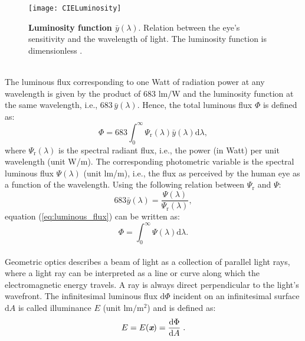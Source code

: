 \begin{figure}[t]
  \begin{center}
  \texttt{[image: CIELuminosity]}
  \end{center}
  \caption{\textbf{Luminosity function $\bar{y}(\lambda)$}. Relation between the eye's sensitivity and the wavelength of light. The luminosity function is dimensionless  \cite{wiki}.}
  \label{fig:luminosityfunction}
  \end{figure}
\\ \indent The luminous flux corresponding to one Watt of radiation power at any wavelength is given by the product of $683$ $\textrm{lm/W}$ and the luminosity function at the same wavelength,
i.e., $683 \, \bar{y}(\lambda)$. Hence, the total luminous flux $\Phi$ is defined as:
\begin{equation}\label{eq:luminous_flux}
\Phi = 683 \int_0^\infty \Psi_\textrm{r}(\lambda) \bar{y}(\lambda)\textrm{d}\lambda,
\end{equation}
where $\Psi_\textrm{r}(\lambda)$ is the spectral radiant flux, i.e., the power (in Watt) per unit wavelength (unit \textrm{W}/\textrm{m}). The corresponding photometric variable is the spectral luminous flux $\Psi(\lambda)$ (unit \textrm{lm}/\textrm{m}), i.e., the flux as perceived by the human eye as a function of the wavelength. 
Using the following relation between $\Psi_\textrm{r}$ and $\Psi$:
\begin{equation}
683 \bar{y}(\lambda) = \frac{\Psi(\lambda)}{\Psi_\textrm{r}(\lambda)}, 
\end{equation}
equation (\ref{eq:luminous_flux}) can be written as:
\begin{equation}
\Phi = \int_0^\infty \Psi(\lambda)\textrm{d}\lambda.
\end{equation}
\\ \indent Geometric optics describes a beam of light as a collection of parallel light rays, where a light ray can be interpreted as a line or curve along which the electromagnetic energy travels. A ray is always direct perpendicular to the light's wavefront.  
The infinitesimal luminous flux $\textrm{d}\Phi$ incident on an infinitesimal surface $\textrm{d}A$ is called illuminance $E$ (unit $\textrm{lm}/\textrm{m}^2$)
and is defined as:
\begin{equation}
 E=E(\textit{\textbf{x}}) = \frac{\textrm{d}\Phi}{\textrm{d}A}\;.
 \end{equation}
